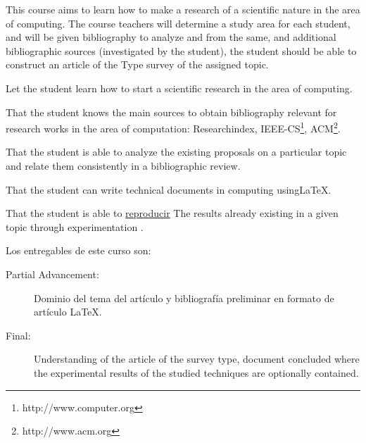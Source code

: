 \begin{syllabus}


\begin{justification}
This course aims to learn how to make a research of a scientific nature in the area of computing. The course teachers will determine a study area for each student, and will be given bibliography to analyze and from the same, and additional bibliographic sources (investigated by the student), the student should be able to construct an article of the Type survey of the assigned topic.
\end{justification}

\begin{goals}
\item Let the student learn how to start a scientific research in the area of computing.
\item That the student knows the main sources to obtain bibliography relevant for research works in the area of computation: Researchindex, IEEE-CS\footnote{http://www.computer.org}, ACM\footnote{http://www.acm.org}.
\item That the student is able to analyze the existing proposals on a particular topic and relate them consistently in a bibliographic review.
\item That the student can write technical documents in computing using\LaTeX.
\item That the student is able to \underline{reproducir} The results already existing in a given topic through experimentation .
\item Los entregables de este curso son:
	\begin{description}
	\item [Partial Advancement:] Dominio del tema del artículo y bibliografía preliminar en formato de artículo \LaTeX.
	\item [Final:] Understanding of the article of the survey type, document concluded where the experimental results of the studied techniques are optionally contained.
	\end{description}
\end{goals}

\begin{outcomes}
  \item {}
  \item {}
  \item {}
  \item {}
  \item {}
  \item {}
  \item {}
  \item {}
\end{outcomes}
\begin{competences}
    \item {} 
    \item {}
    \item {}
\end{competences}


\end{syllabus}
